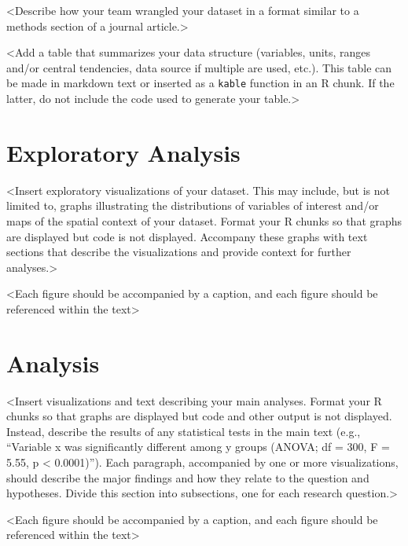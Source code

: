 \documentclass[12pt,]{article}
\begin{document}
\textless{}Describe how your team wrangled your dataset in a format
similar to a methods section of a journal article.\textgreater{}

\textless{}Add a table that summarizes your data structure (variables,
units, ranges and/or central tendencies, data source if multiple are
used, etc.). This table can be made in markdown text or inserted as a
\texttt{kable} function in an R chunk. If the latter, do not include the
code used to generate your table.\textgreater{}

\newpage

\hypertarget{exploratory-analysis}{%
\section{Exploratory Analysis}\label{exploratory-analysis}}

\textless{}Insert exploratory visualizations of your dataset. This may
include, but is not limited to, graphs illustrating the distributions of
variables of interest and/or maps of the spatial context of your
dataset. Format your R chunks so that graphs are displayed but code is
not displayed. Accompany these graphs with text sections that describe
the visualizations and provide context for further
analyses.\textgreater{}

\textless{}Each figure should be accompanied by a caption, and each
figure should be referenced within the text\textgreater{}

\newpage

\hypertarget{analysis}{%
\section{Analysis}\label{analysis}}

\textless{}Insert visualizations and text describing your main analyses.
Format your R chunks so that graphs are displayed but code and other
output is not displayed. Instead, describe the results of any
statistical tests in the main text (e.g., ``Variable x was significantly
different among y groups (ANOVA; df = 300, F = 5.55, p \textless{}
0.0001)''). Each paragraph, accompanied by one or more visualizations,
should describe the major findings and how they relate to the question
and hypotheses. Divide this section into subsections, one for each
research question.\textgreater{}

\textless{}Each figure should be accompanied by a caption, and each
figure should be referenced within the text\textgreater{}
\end{document}
